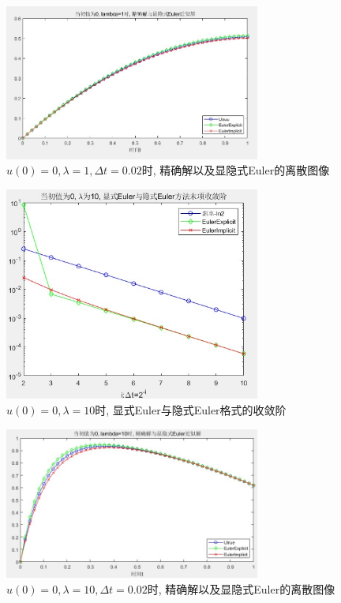 \documentclass[12pt]{article}
\begin{document}
\begin{figure}[H]
	\centering
	\includegraphics[width=0.75\textwidth]{2}
	\caption{$u(0)=0, \lambda=1,\Delta{t}=0.02$时, 精确解以及显隐式Euler的离散图像}
\end{figure}
\begin{figure}[H]
	\centering
	\includegraphics[width=0.75\textwidth]{3}
	\caption{$u(0)=0, \lambda=10$时, 显式Euler与隐式Euler格式的收敛阶}
\end{figure}
\begin{figure}[H]
	\centering
	\includegraphics[width=0.75\textwidth]{4}
	\caption{$u(0)=0, \lambda=10,\Delta{t}=0.02$时, 精确解以及显隐式Euler的离散图像}
\end{figure}
\end{document}
